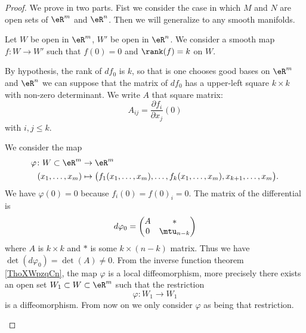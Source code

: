 \begin{proof}
	We prove in two parts. Fist we consider the case in which \( M\) and \( N\) are open sets of \( \eR^m\) and \( \eR^n\). Then we will generalize to any smooth manifolds.
	\begin{subproof}
		Let \( W\) be open in \( \eR^m\), \( W'\) be open in \( \eR^n\). We consider a smooth map \( f\colon W\to W'\) such that \( f(0)=0\) and \( \rank(f)=k\) on \( W\).

		By hypothesis, the rank of \( df_0\) is \( k\), so that is one chooses good bases on \( \eR^m\) and \( \eR^n\) we can suppose that the matrix of \( df_0\) has a upper-left square \( k\times k\) with non-zero determinant. We write \( A\) that square matrix:
		\begin{equation}
			A_{ij}=\frac{ \partial f_i }{ \partial x_j }(0)
		\end{equation}
		with \( i,j\leq k\).

		\begin{subproof}

			We consider the map
			\begin{equation}
				\begin{aligned}
					\varphi\colon W\subset \eR^m & \to \eR^m                                                                                  \\
					(x_1,\ldots, x_m)            & \mapsto \big( f_1(x_1,\ldots, x_m),\ldots, f_k(x_1,\ldots, x_m),x_{k+1},\ldots, x_m \big).
				\end{aligned}
			\end{equation}
			We have \( \varphi(0)=0\) because \( f_i(0)=f(0)_i=0\). The matrix of the differential is
			\begin{equation}
				d\varphi_0=\begin{pmatrix}
					A & *          \\
					0 & \mtu_{n-k}
				\end{pmatrix}
			\end{equation}
			where \( A\) is \( k\times k\) and \( *\) is some \( k\times (n-k)\) matrix. Thus we have \( \det(d\varphi_0)=\det(A)\neq 0\). From the inverse function theorem \ref{ThoXWpzqCn}, the map \( \varphi\) is a local diffeomorphism, more precisely there exists an open set \( W_1\subset W\subset \eR^m\) such that the restriction
			\begin{equation}
				\varphi\colon W_1\to W_1
			\end{equation}
			is a diffeomorphism. From now on we only consider \( \varphi\) as being that restriction.


\end{subproof}
\end{subproof}
\end{proof}
